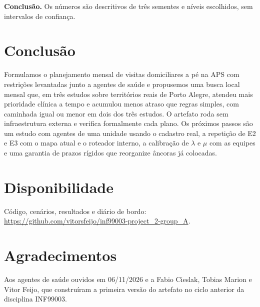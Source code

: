 \documentclass[conference,a4paper]{IEEEtran}
\begin{document}
\textbf{Conclusão.} Os números são descritivos de três sementes e níveis escolhidos, sem intervalos de confiança.

\section{Conclusão}

Formulamos o planejamento mensal de visitas domiciliares a pé na APS com restrições levantadas junto a agentes de saúde e propusemos uma busca local mensal que, em três estudos sobre territórios reais de Porto Alegre, atendeu mais prioridade clínica a tempo e acumulou menos atraso que regras simples, com caminhada igual ou menor em dois dos três estudos. O artefato roda sem infraestrutura externa e verifica formalmente cada plano. Os próximos passos são um estudo com agentes de uma unidade usando o cadastro real, a repetição de E2 e E3 com o mapa atual e o roteador interno, a calibração de $\lambda$ e $\mu$ com as equipes e uma garantia de prazos rígidos que reorganize âncoras já colocadas.

\section*{Disponibilidade}

Código, cenários, resultados e diário de bordo: \url{https://github.com/vitorsfeijo/inf99003-project_2-group_A}.

\section*{Agradecimentos}

Aos agentes de saúde ouvidos em 06/11/2026 e a Fabio Cieslak, Tobias Marion e Vitor Feijo, que construíram a primeira versão do artefato no ciclo anterior da disciplina INF99003.



\end{document}
